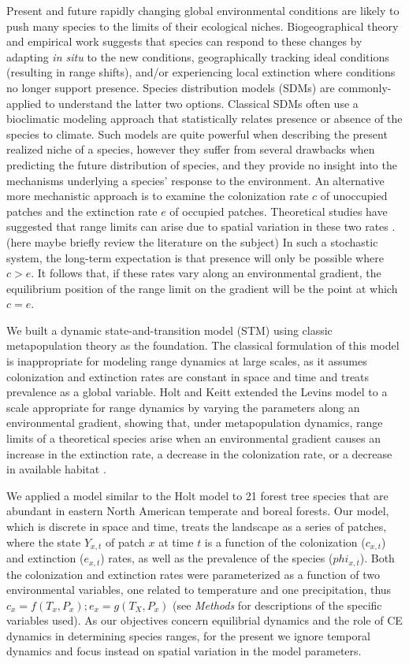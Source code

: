 \documentclass[11pt]{article}
\begin{document}
Present and future rapidly changing global environmental conditions are likely to push many species to the limits of their ecological niches.
Biogeographical theory and empirical work suggests that species can respond to these changes by adapting \emph{in situ} to the new conditions, geographically tracking ideal conditions (resulting in range shifts), and/or experiencing local extinction where conditions no longer support presence.
Species distribution models (SDMs) are commonly-applied to understand the latter two options.
Classical SDMs often use a bioclimatic modeling approach that statistically relates presence or absence of the species to climate.
Such models are quite powerful when describing the present realized niche of a species, however they suffer from several drawbacks when predicting the future distribution of species, and they provide no insight into the mechanisms underlying a species' response to the environment.
An alternative more mechanistic approach is to examine the colonization rate $c$ of unoccupied patches and the extinction rate $e$ of occupied patches.
Theoretical studies have suggested that range limits can arise due to spatial variation in these two rates \cite{Holt2000, Holt2005}.
(here maybe briefly review the literature on the subject)
In such a stochastic system, the long-term expectation is that presence will only be possible where $c > e$.
It follows that, if these rates vary along an environmental gradient, the equilibrium position of the range limit on the gradient will be the point at which $c = e$.

We built a dynamic state-and-transition model (STM) using classic metapopulation theory \citep{Levins1969} as the foundation.
The classical formulation of this model is inappropriate for modeling range dynamics at large scales, as it assumes colonization and extinction rates are constant in space and time and treats prevalence as a global variable.
Holt and Keitt extended the Levins model to a scale appropriate for range dynamics by varying the parameters along an environmental gradient, showing that, under metapopulation dynamics, range limits of a theoretical species arise when an environmental gradient causes an increase in the extinction rate, a decrease in the colonization rate, or a decrease in available habitat \cite{Holt2000}.

We applied a model similar to the Holt model \cite{Holt2000} to 21 forest tree species that are abundant in eastern North American temperate and boreal forests.
Our model, which is discrete in space and time, treats the landscape as a series of patches, where the state $Y_{x,t}$ of patch $x$ at time $t$ is a function of the colonization ($c_{x,t}$) and extinction ($e_{x,t}$) rates, as well as the prevalence of the species ($phi_{x,t}$).
Both the colonization and extinction rates were parameterized as a function of two environmental variables, one related to temperature and one precipitation, thus $c_x = f(T_x, P_x); e_x = g(T_X, P_x)$ (see \emph{Methods} for descriptions of the specific variables used).
As our objectives concern equilibrial dynamics and the role of CE dynamics in determining species ranges, for the present we ignore temporal dynamics and focus instead on spatial variation in the model parameters.
\end{document}

